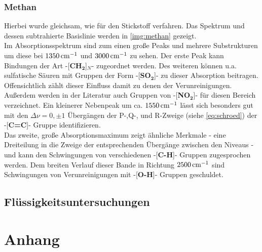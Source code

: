 \documentclass[a4paper,10pt,twocolumn]{article}
\newcommand{\fett}[1]{\textbf{#1}}
\begin{document}
		\subsubsection*{Methan}
		Hierbei wurde gleichsam, wie f\"ur den Stickstoff verfahren. Das Spektrum und dessen subtrahierte Basislinie werden in \autoref{img:methan} gezeigt.\\
		Im Absorptionsspektrum sind zum einen gro{\ss}e Peaks und mehrere Substrukturen um diese bei $\unit[1350]{cm^{-1}}$ und $\unit[3000]{cm^{-1}}$ zu sehen. Der erste Peak kann Bindungen der Art -[\fett{CH}$_{\fett{2}}$]$_{N}$- zugeordnet werden. Des weiteren k\"onnen  u.a. sulfatische S\"auren mit Gruppen der Form -[\fett{SO}$_{\fett{2}}$]- zu dieser Absorption beitragen. Offensichtlich z\"ahlt dieser Einfluss damit zu denen der Verunreinigungen. Au{\ss}erdem werden in der Literatur auch Gruppen von -[\fett{NO}$_{\fett{2}}$]- f\"ur diesen Bereich verzeichnet. Ein kleinerer Nebenpeak um ca. $\unit[1550]{cm^{-1}}$ l\"asst sich besonders gut mit den $\Delta\nu=0,\pm1$ \"Uberg\"angen der P-,Q-, und R-Zweige (siehe \autoref{eq:schroed}) der -[\fett{C=C}]- Gruppe identifizieren.\\
		Das zweite, gro{\ss}e Absorptionsmaximum zeigt \"ahnliche Merkmale - eine Dreiteilung in die Zweige der entsprechenden \"Uberg\"ange zwischen den Niveaus - und kann den Schwingungen von verschiedenen -[\fett{C-H}]- Gruppen zugesprochen werden. Dem breiten Verlauf dieser Bande in Richtung $\unit[2500]{cm^{-1}}$ sind Schwingungen von Verunreinigungen mit -[\fett{O-H}]- Gruppen geschuldet.

		\subsection{Fl\"ussigkeitsuntersuchungen}

	\section{Anhang}

		
		
\end{document}
